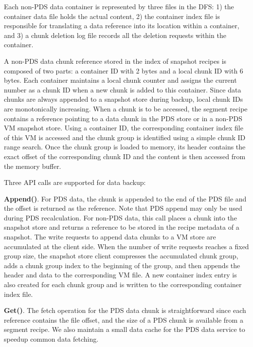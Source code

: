 Each non-PDS data container is represented by three files in the DFS:
1) the container data file holds the actual content, 
2) the container index file is responsible for translating a data reference
into its location within a container, and 
3) a chunk deletion log file records all the deletion requests within  the container.

A non-PDS data chunk reference stored in the index of snapshot recipes
is composed of two parts: a container ID with 2 bytes and a local chunk ID with 6 bytes.
Each container maintains a local  chunk counter and assigns the current number 
as a chunk ID  when  a new chunk is added to this  container. 
Since data chunks are always appended to a snapshot store during backup, 
local chunk IDs are monotonically increasing.
When a chunk is to be accessed, the segment recipe contains a reference pointing to  a data chunk
in the PDS store or in a non-PDS VM snapshot  store. 
Using  a container ID, the corresponding container index file of this VM is accessed and 
the chunk group is identified using a simple chunk ID range search. Once the chunk group is loaded to memory, 
its header contains the exact offset of the corresponding chunk ID and the content is then accessed from the memory buffer.



Three API calls are supported for data backup:

\noindent\textbf{Append()}. 
For PDS data, the chunk is appended to the end of the PDS file and the offset is returned as the  reference.
Note that PDS append may only be used during PDS recalculation.
For non-PDS data, this call places a chunk into 
the snapshot store and returns a reference to be stored in 
the recipe metadata of a snapshot. 
The write requests to append data chunks to a VM store are accumulated at the client side. 
When the number of write requests reaches a fixed group size, the snapshot store client compresses
the accumulated   chunk group, adds a chunk group index  to the beginning of the group, and then
appends the header and data  to the corresponding VM file.
A new container  index entry is also created for each chunk group and is written to the corresponding
container index file.

\noindent\textbf{Get()}.
The fetch operation for the PDS data chunk is straightforward since each reference contains 
the file offset, and the size of a PDS chunk is available from a segment recipe.
We also maintain a small data cache for the PDS data service to speedup common data fetching.

